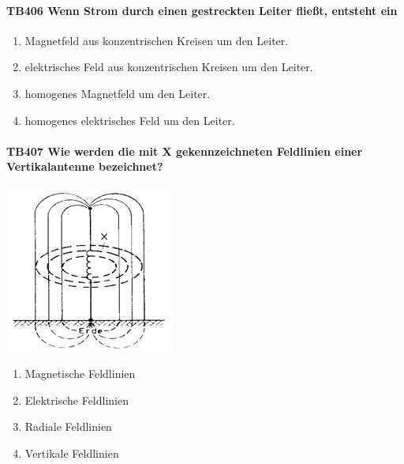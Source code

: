 \documentclass[8pt]{article}
\begin{document}
\begin{enumerate}
\paragraph*{TB406 Wenn Strom durch einen gestreckten Leiter fließt, entsteht ein}
\begin{enumerate}[nolistsep,label=\Alph*]
\item Magnetfeld aus konzentrischen Kreisen um den Leiter.
\item elektrisches Feld aus konzentrischen Kreisen um den Leiter.
\item homogenes Magnetfeld um den Leiter.
\item homogenes elektrisches Feld um den Leiter. 
\end{enumerate}



\paragraph*{TB407 Wie werden die mit X gekennzeichneten Feldlinien einer Vertikalantenne bezeichnet?}
\begin{center}
	\begin{minipage}{\linewidth}
		\centering
		\includegraphics[scale=0.7]{pics/tb407_a.jpg}
	\end{minipage}
\end{center}
\begin{enumerate}[nolistsep,label=\Alph*]
\item Magnetische Feldlinien
\item Elektrische Feldlinien
\item Radiale Feldlinien
\item Vertikale Feldlinien
\end{enumerate}




\end{enumerate}
\end{document}
